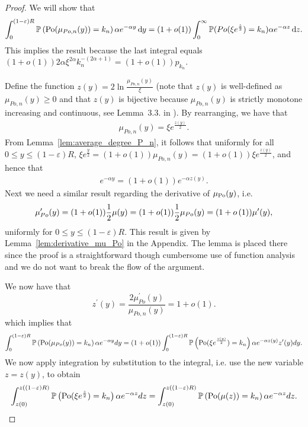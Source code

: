 \begin{proof}
We will show that
\[
	\int_0^{(1-\varepsilon)R} \mathbb{P}\left({\mathrm{Po}}(\mu_{Po,n}(y)) = k_n\right) \alpha e^{-\alpha y} \operatorname{\mathrm{d}\hspace{-2pt}} y
	= (1+o(1))\int_0^\infty \mathbb{P}(Po(\xi e^{\frac{z}{2}})=k_n) \alpha e^{-\alpha z} \operatorname{\mathrm{d}\hspace{-2pt}} z.
\]
This implies the result because the last integral equals $(1+o(1))2\alpha \xi^{2\alpha} k_n^{-(2\alpha+1)} = (1+o(1))p_{k_n}$.

Define the function $z(y)=2\ln\frac{\mu_{Po,n}(y)}{\xi}$ (note that $z(y)$ is well-defined as $\mu_{Po,n}(y)\geq 0$ and that $z(y)$ is bijective because $\mu_{Po,n}(y)$ is strictly monotone increasing and continuous, see Lemma~3.3. in \cite{gugelmann2012random}). By rearranging, we have that
\begin{align*}
\mu_{Po,n}(y) = \xi e^{\frac{z(y)}{2}}.
\end{align*}
From Lemma~\ref{lem:average_degree_P_n}, it follows that uniformly for all $0\leq y\leq (1-\varepsilon)R$, $\xi e^{\frac{y}{2}} = (1+o(1))\mu_{Po,n}(y) = (1+o(1))\xi e^{\frac{z(y)}{2}}$, and hence that
\begin{align*}
e^{-\alpha y} = (1+o(1))e^{-\alpha z(y)}.
\end{align*}
Next we need a similar result regarding the derivative of $\mu_{{\mathrm{Po}}}(y)$, i.e.
\[
	\mu_{Po}^\prime(y) = (1+o(1))\frac{1}{2}\mu(y) = (1+o(1))\frac{1}{2}\mu_{Po}(y)
	= (1+o\left(1\right)) \mu^\prime(y),
\]
uniformly for $0 \leq  y \leq (1-\varepsilon)R$. This result is given by Lemma~\ref{lem:derivative_mu_Po} in the Appendix. The lemma is placed there since the proof is a straightforward though cumbersome use of function analysis and we do not want to break the flow of the argument.

We now have that
\[
	z^\prime(y) = \frac{2\mu_{Po}^\prime(y)}{\mu_{Po,n}(y)} = 1+o(1).
\]
which implies that
\begin{align*}
	\int_0^{(1-\varepsilon)R} \mathbb{P}\left({\mathrm{Po}}(\mu_{Po}(y))=k_n\right) \alpha e^{-\alpha y}dy 
	= (1+o(1)) \int_0^{(1-\varepsilon)R} \mathbb{P}\left({\mathrm{Po}}(\xi e^{\frac{z(y)}{2}})=k_n\right)\alpha e^{-\alpha z(y)} z^\prime(y) dy.
\end{align*}
We now apply integration by substitution to the integral, i.e. use the new variable $z=z(y)$, to obtain 
\begin{align*}
	\int_{z(0)}^{z((1-\varepsilon)R)} \mathbb{P}\left({\mathrm{Po}}(\xi e^{\frac{z}{2}})=k_n\right)\alpha e^{-\alpha z} dz
	= \int_{z(0)}^{z((1-\varepsilon)R)} \mathbb{P}\left({\mathrm{Po}}(\mu(z))=k_n\right)\alpha e^{-\alpha z} dz.
\end{align*}



\end{proof}
